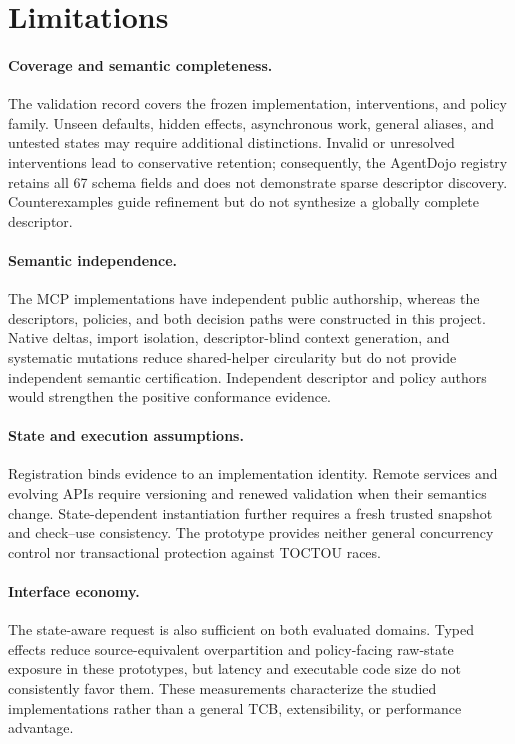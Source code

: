 \section{Limitations}
\label{sec:limitations}

\paragraph{Coverage and semantic completeness.}
The validation record covers the frozen implementation, interventions, and
policy family. Unseen defaults, hidden effects, asynchronous work, general
aliases, and untested states may require additional distinctions. Invalid or
unresolved interventions lead to conservative retention; consequently, the
AgentDojo registry retains all 67 schema fields and does not demonstrate sparse
descriptor discovery. Counterexamples guide refinement but do not synthesize a
globally complete descriptor.

\paragraph{Semantic independence.}
The MCP implementations have independent public authorship, whereas the
descriptors, policies, and both decision paths were constructed in this
project. Native deltas, import isolation, descriptor-blind context generation,
and systematic mutations reduce shared-helper circularity but do not provide
independent semantic certification. Independent descriptor and policy authors
would strengthen the positive conformance evidence.

\paragraph{State and execution assumptions.}
Registration binds evidence to an implementation identity. Remote services and
evolving APIs require versioning and renewed validation when their semantics
change. State-dependent instantiation further requires a fresh trusted snapshot
and check--use consistency. The prototype provides neither general concurrency
control nor transactional protection against TOCTOU races.

\paragraph{Interface economy.}
The state-aware request is also sufficient on both evaluated domains. Typed
effects reduce source-equivalent overpartition and policy-facing raw-state
exposure in these prototypes, but latency and executable code size do not
consistently favor them. These measurements characterize the studied
implementations rather than a general TCB, extensibility, or performance
advantage.


